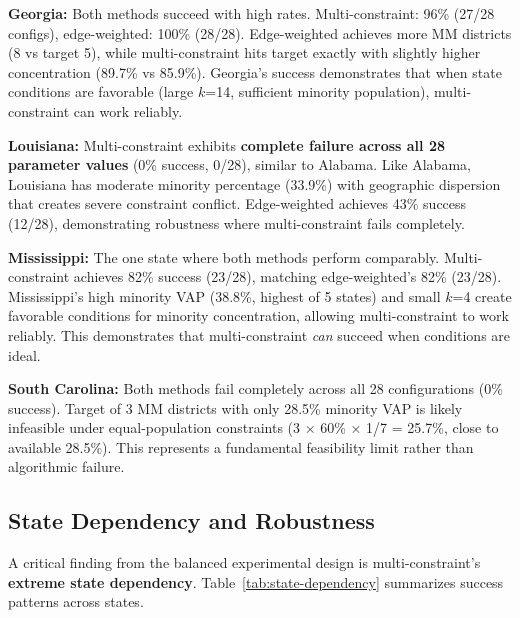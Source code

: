 \textbf{Georgia:} Both methods succeed with high rates. Multi-constraint: 96\% (27/28 configs), edge-weighted: 100\% (28/28). Edge-weighted achieves more MM districts (8 vs target 5), while multi-constraint hits target exactly with slightly higher concentration (89.7\% vs 85.9\%). Georgia's success demonstrates that when state conditions are favorable (large $k$=14, sufficient minority population), multi-constraint can work reliably.

\textbf{Louisiana:} Multi-constraint exhibits \textbf{complete failure across all 28 parameter values} (0\% success, 0/28), similar to Alabama. Like Alabama, Louisiana has moderate minority percentage (33.9\%) with geographic dispersion that creates severe constraint conflict. Edge-weighted achieves 43\% success (12/28), demonstrating robustness where multi-constraint fails completely.

\textbf{Mississippi:} The one state where both methods perform comparably. Multi-constraint achieves 82\% success (23/28), matching edge-weighted's 82\% (23/28). Mississippi's high minority VAP (38.8\%, highest of 5 states) and small $k$=4 create favorable conditions for minority concentration, allowing multi-constraint to work reliably. This demonstrates that multi-constraint \textit{can} succeed when conditions are ideal.

\textbf{South Carolina:} Both methods fail completely across all 28 configurations (0\% success). Target of 3 MM districts with only 28.5\% minority VAP is likely infeasible under equal-population constraints (3 × 60\% × 1/7 = 25.7\%, close to available 28.5\%). This represents a fundamental feasibility limit rather than algorithmic failure.

\subsection{State Dependency and Robustness}

A critical finding from the balanced experimental design is multi-constraint's \textbf{extreme state dependency}. Table~\ref{tab:state-dependency} summarizes success patterns across states.


